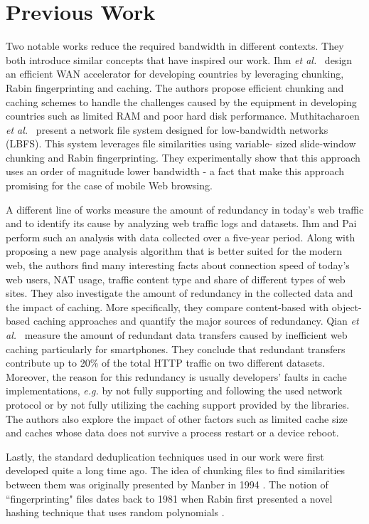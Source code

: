 \section{Previous Work}\label{sec:rel_work}
Two notable works reduce the required bandwidth in different contexts. They both introduce similar concepts that have
inspired our work. Ihm \textit{et al.}~\cite{wanax} design an efficient WAN accelerator for developing countries by leveraging chunking, Rabin fingerprinting and caching. 
The authors propose efficient chunking and caching schemes to handle the challenges caused by the equipment in developing countries such as limited RAM and poor hard disk performance. Muthitacharoen \textit{et al.}~\cite{lbfs} present a network file system designed for low-bandwidth networks (LBFS). This system leverages file similarities using variable-
sized slide-window chunking and Rabin fingerprinting. They experimentally show that this approach uses an order of
magnitude lower bandwidth - a fact that make this approach promising for the case of mobile Web browsing.

A different line of works measure the amount of redundancy in today's web traffic and to identify its cause by
analyzing web traffic logs and datasets. Ihm and Pai~\cite{modern_web_traffic} perform such an analysis %
with data collected over a five-year period. Along with proposing a new page analysis algorithm 
that is better suited for the modern web, the authors find many interesting facts about connection speed of today's web users, NAT usage, traffic content type and share of different types of web sites. They also investigate the amount of redundancy in the collected data and the impact of caching. More specifically, they compare content-based with object-based caching approaches and quantify the major sources of redundancy. 
Qian \textit{et al.}~\cite{web_caching} measure the 
amount of redundant data transfers caused by inefficient web caching particularly for smartphones. They conclude that redundant transfers contribute up to 20\% of the total HTTP traffic on two different datasets. Moreover, the reason for this redundancy is usually developers' faults in cache implementations, \textit{e.g.} by not fully supporting and following the used network protocol or by not fully utilizing the caching support provided by the libraries. The authors also explore the impact of other factors such as limited cache size and caches whose data does not survive a process restart or a device reboot.

Lastly, the standard deduplication techniques used in our work were first developed quite a long time ago. The idea of chunking files to find 
similarities between them was originally presented by Manber in 1994 \cite{manber}. The notion of ``fingerprinting" 
files dates back to 1981 when Rabin first presented a novel hashing technique that uses random polynomials \cite{rabin}.
